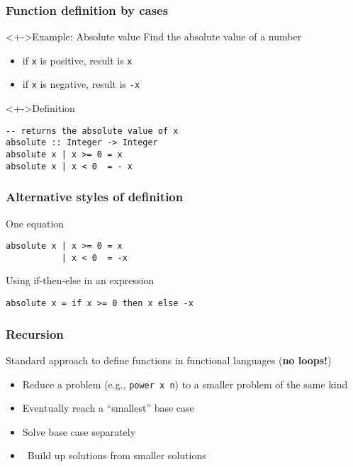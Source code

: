 \documentclass{beamer}
\subtitle{Functions}
\begin{document}
\begin{frame}
  \titlepage
\end{frame}
\begin{frame}[fragile]
  \frametitle{Function definition by cases}
  \begin{block}<+->{Example: Absolute value}
    Find the absolute value of a number
    \begin{itemize}
    \item if \texttt{x} is positive, result is \texttt{x}
    \item if \texttt{x} is negative, result is \texttt{-x}
    \end{itemize}
  \end{block}
  \begin{block}<+->{Definition}
\begin{verbatim}
-- returns the absolute value of x
absolute :: Integer -> Integer
absolute x | x >= 0 = x
absolute x | x < 0  = - x
\end{verbatim}
  \end{block}
\end{frame}

\begin{frame}
  \frametitle{Alternative styles of definition}
  
  \begin{block}{One equation}
\begin{verbatim}
absolute x | x >= 0 = x
           | x < 0  = -x
\end{verbatim}
  \end{block}
  
  \begin{block}{Using if-then-else in an expression}
\begin{verbatim}
absolute x = if x >= 0 then x else -x
\end{verbatim}
  \end{block}
\end{frame}

\begin{frame}
  \frametitle{Recursion}
  Standard approach to define functions in functional languages
  (\textbf{no loops!})
  \begin{itemize}
  \item Reduce a problem (e.g., \texttt{power x n}) to a smaller
    problem of the same kind 
  \item  Eventually reach a ``smallest'' base case 
  \item  Solve base case separately 
  \item  Build up solutions from smaller solutions
  \end{itemize}
\end{frame}
\end{document}
